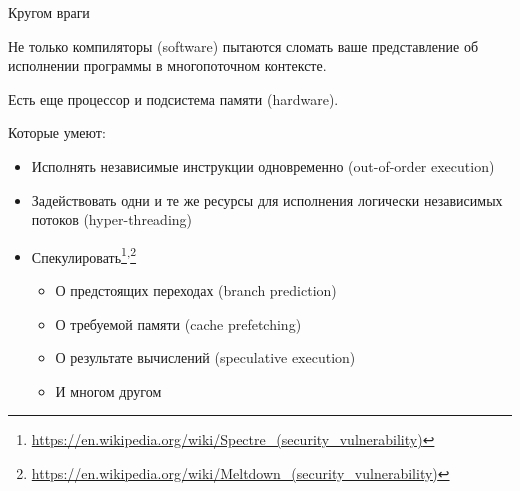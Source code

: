 \begin{frame}[t,noframenumbering]{Кругом враги}

Не только компиляторы (software) пытаются сломать ваше представление об исполнении программы в многопоточном контексте. 

Есть еще процессор и подсистема памяти (hardware). 

Которые умеют:
\begin{itemize}
    \item Исполнять независимые инструкции одновременно (out-of-order execution)

    \item Задействовать одни и те же ресурсы для исполнения логически независимых потоков (hyper-threading)

    \item Спекулировать\footnote{\tiny\url{https://en.wikipedia.org/wiki/Spectre_(security_vulnerability)}}\textsuperscript{,}\footnote{\tiny\url{https://en.wikipedia.org/wiki/Meltdown_(security_vulnerability)}}
    \begin{itemize}
        \item О предстоящих переходах (branch prediction)
        \item О требуемой памяти (cache prefetching)
        \item О результате вычислений (speculative execution)
        \item И многом другом
    \end{itemize}
\end{itemize}

\end{frame}


